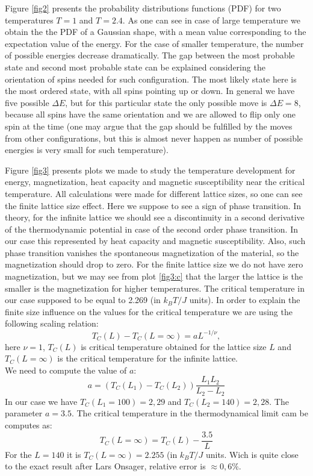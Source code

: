 \documentclass[a4paper]{article}
\begin{document}
Figure \ref{fig2} presents the probability distributions functions (PDF) for two temperatures $T=1$ and $T=2.4$. As one can see in case of large temperature we obtain the the PDF of a Gaussian shape, with a mean value corresponding to the expectation value of the energy. For the case of smaller temperature, the number of possible energies decrease dramatically. The gap between the most probable state and second most probable state can be explained considering the orientation of spins needed for such configuration. The most likely state here is the most ordered state, with all spins pointing up or down. In general we have five possible $\Delta E$, but for this particular state the only possible move is $\Delta E =8$, because all spins have the same orientation and we are allowed to flip only one spin at the time (one may argue that the gap should be fulfilled by the moves from other configurations, but this is almost never happen as number of possible energies is very small for such temperature).

Figure \ref{fig3} presents plots we made to study the temperature development for energy, magnetization, heat capacity and magnetic susceptibility near the critical temperature. All calculations were made for different lattice sizes, so one can see the finite lattice size effect. Here we suppose to see a sign of phase transition. In theory, for the infinite lattice we should see a discontinuity in a second derivative of the thermodynamic potential in case of the second order phase transition. In our case this represented by heat capacity and magnetic susceptibility. Also, such phase transition vanishes the spontaneous magnetization of the material, so the magnetization should drop to zero.  For the finite lattice size we do not have zero magnetization, but we may see from plot \ref{fig3:c} that the larger the lattice is the smaller is the magnetization for higher temperatures. The critical temperature in our case supposed to be equal to 2.269 (in $k_BT/J$ units). 
In order to explain the finite size influence on the values for the critical temperature we are using the following scaling relation:
\begin{equation}
 T_C(L)-T_C(L=\infty) = aL^{-1/\nu},
 \label{eq:tc}
\end{equation}
here $\nu =1$, $T_C(L)$ is critical temperature obtained for the lattice size $L$ and $T_C(L=\infty)$ is the critical temperature for the infinite lattice. \\
We need to compute the value of $a$:
\begin{equation}
a=(T_C(L_1)-T_C(L_2))\frac{L_1 L_2}{L_2-L_2}
\end{equation}
In our case we have $T_C(L_1 =100)=2,29$ and $T_C(L_2 =140)=2,28$. The parameter $a=3.5$. The critical temperature in the thermodynamical limit cam be computes as:
\begin{equation}
T_C(L=\infty) = T_C(L)-\frac{3.5}{L}
\end{equation}
For the $L=140$ it is $T_C(L=\infty)= 2.255$ (in $k_BT/J$ units. Wich is quite close to the exact result after Lars Onsager, relative error is $\approx 0,6\%$.
\end{document}
